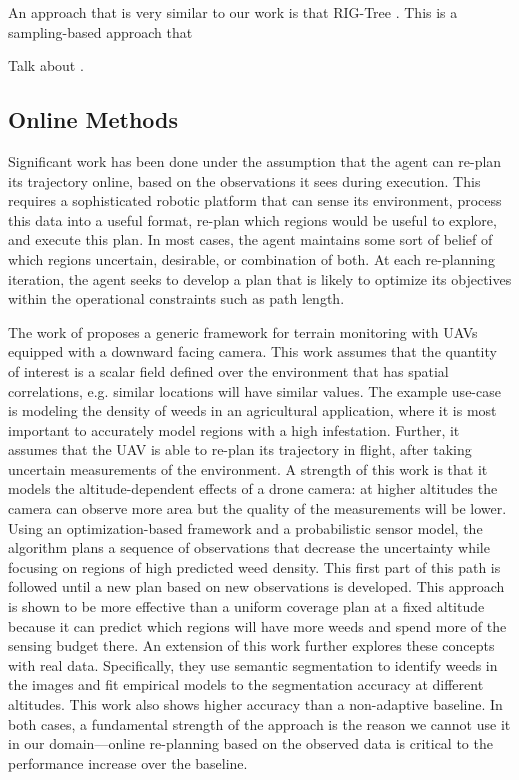 An approach that is very similar to our work is that RIG-Tree \cite{Hollinger2014Sampling-basedAlgorithms}. This is a sampling-based approach that 

Talk about \cite{GhaffariJadidi2019Sampling-basedMonitoring}.

\subsection{Online Methods}
Significant work has been done under the assumption that the agent can re-plan its trajectory online, based on the observations it sees during execution. This requires a sophisticated robotic platform that can sense its environment, process this data into a useful format, re-plan which regions would be useful to explore, and execute this plan. In most cases, the agent maintains some sort of belief of which regions uncertain, desirable, or combination of both. At each re-planning iteration, the agent seeks to develop a plan that is likely to optimize its objectives within the operational constraints such as path length.

The work of \cite{Popovic2020} proposes a generic framework for terrain monitoring with UAVs equipped with a downward facing camera. This work assumes that the quantity of interest is a scalar field defined over the environment that has spatial correlations, e.g. similar locations will have similar values. The example use-case is modeling the density of weeds in an agricultural application, where it is most important to accurately model regions with a high infestation. Further, it assumes that the UAV is able to re-plan its trajectory in flight, after taking uncertain measurements of the environment. A strength of this work is that it models the altitude-dependent effects of a drone camera: at higher altitudes the camera can observe more area but the quality of the measurements will be lower. Using an optimization-based framework and a probabilistic sensor model, the algorithm plans a sequence of observations that decrease the uncertainty while focusing on regions of high predicted weed density. This first part of this path is followed until a new plan based on new observations is developed. This approach is shown to be more effective than a uniform coverage plan at a fixed altitude because it can predict which regions will have more weeds and spend more of the sensing budget there. An extension of this work \cite{Stache2021AdaptiveSegmentation} further explores these concepts with real data. Specifically, they use semantic segmentation to identify weeds in the images and fit empirical models to the segmentation accuracy at different altitudes. This work also shows higher accuracy than a non-adaptive baseline. In both cases, a fundamental strength of the approach is the reason we cannot use it in our domain---online re-planning based on the observed data is critical to the performance increase over the baseline.

